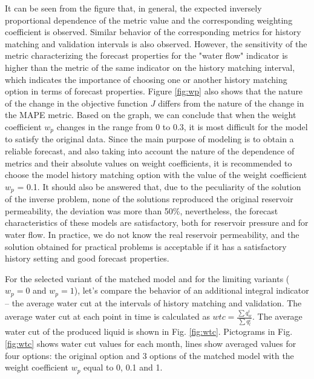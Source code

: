 \documentclass[
11pt,%
tightenlines,%
twoside,%
onecolumn,%
nofloats,%
nobibnotes,%
nofootinbib,%
superscriptaddress,%
noshowpacs,%
centertags]%
{revtex4}
\begin{document}
It can be seen from the figure that, in general, the expected
inversely proportional dependence of the metric value and the
corresponding weighting coefficient is observed. Similar behavior of
the corresponding metrics for history matching and validation
intervals is also observed. However, the sensitivity of the metric
characterizing the forecast properties for the "water flow"
indicator is higher than the metric of the same indicator on the
history matching interval, which indicates the importance of
choosing one or another history matching option in terms of
forecast properties. Figure \ref{fig:wp} also shows that the
nature of the change in the objective function $J$ differs from the
nature of the change in the MAPE metric. Based on the graph, we can
conclude that when the weight coefficient $w_p$ changes in the range
from 0 to 0.3, it is most difficult for the model to satisfy the
original data. Since the main purpose of modeling is to obtain a
reliable forecast, and also taking into account the nature of the
dependence of metrics and their absolute values on weight
coefficients, it is recommended to choose the model history matching
option with the value of the weight coefficient $w_p$ = 0.1. It
should also be answered that, due to the peculiarity of the solution
of the inverse problem, none of the solutions reproduced the
original reservoir permeability, the deviation was more than 50\%,
nevertheless, the forecast characteristics of these models are
satisfactory, both for reservoir pressure and for water flow. In
practice, we do not know the real reservoir permeability, and the
solution obtained for practical problems is acceptable if it has a
satisfactory history setting and good forecast properties.

For the selected variant of the matched model and for the
limiting variants ($w_p = 0$ and $w_p = 1$), let's compare the
behavior of an additional integral indicator -- the average water
cut at the intervals of history matching and validation. The average
water cut at each point in time is calculated as $wtc =
\frac{\sum{q_w^i}}{\sum{q_l^i}}$. The average water cut of the
produced liquid is shown in Fig. \ref{fig:wtc}. Pictograms in Fig.
\ref{fig:wtc} shows water cut values for each month, lines show
averaged values for four options: the original option and 3 options
of the matched model with the weight coefficient $w_p$ equal to
0, 0.1 and 1.
\end{document}
